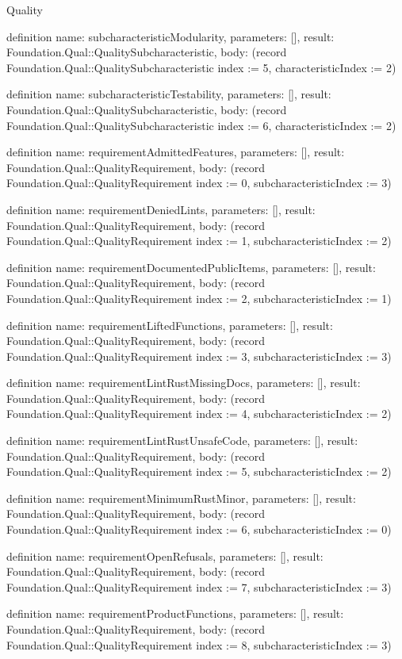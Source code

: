\begin{lexlean}{Quality}
\begin{semanticmodule}
definition{
  name: subcharacteristicModularity,
  parameters: [],
  result: Foundation.Qual::QualitySubcharacteristic,
  body: (record Foundation.Qual::QualitySubcharacteristic {index := 5, characteristicIndex := 2})
}

definition{
  name: subcharacteristicTestability,
  parameters: [],
  result: Foundation.Qual::QualitySubcharacteristic,
  body: (record Foundation.Qual::QualitySubcharacteristic {index := 6, characteristicIndex := 2})
}

definition{
  name: requirementAdmittedFeatures,
  parameters: [],
  result: Foundation.Qual::QualityRequirement,
  body: (record Foundation.Qual::QualityRequirement {index := 0, subcharacteristicIndex := 3})
}

definition{
  name: requirementDeniedLints,
  parameters: [],
  result: Foundation.Qual::QualityRequirement,
  body: (record Foundation.Qual::QualityRequirement {index := 1, subcharacteristicIndex := 2})
}

definition{
  name: requirementDocumentedPublicItems,
  parameters: [],
  result: Foundation.Qual::QualityRequirement,
  body: (record Foundation.Qual::QualityRequirement {index := 2, subcharacteristicIndex := 1})
}

definition{
  name: requirementLiftedFunctions,
  parameters: [],
  result: Foundation.Qual::QualityRequirement,
  body: (record Foundation.Qual::QualityRequirement {index := 3, subcharacteristicIndex := 3})
}

definition{
  name: requirementLintRustMissingDocs,
  parameters: [],
  result: Foundation.Qual::QualityRequirement,
  body: (record Foundation.Qual::QualityRequirement {index := 4, subcharacteristicIndex := 2})
}

definition{
  name: requirementLintRustUnsafeCode,
  parameters: [],
  result: Foundation.Qual::QualityRequirement,
  body: (record Foundation.Qual::QualityRequirement {index := 5, subcharacteristicIndex := 2})
}

definition{
  name: requirementMinimumRustMinor,
  parameters: [],
  result: Foundation.Qual::QualityRequirement,
  body: (record Foundation.Qual::QualityRequirement {index := 6, subcharacteristicIndex := 0})
}

definition{
  name: requirementOpenRefusals,
  parameters: [],
  result: Foundation.Qual::QualityRequirement,
  body: (record Foundation.Qual::QualityRequirement {index := 7, subcharacteristicIndex := 3})
}

definition{
  name: requirementProductFunctions,
  parameters: [],
  result: Foundation.Qual::QualityRequirement,
  body: (record Foundation.Qual::QualityRequirement {index := 8, subcharacteristicIndex := 3})
}


\end{semanticmodule}
\end{lexlean}
